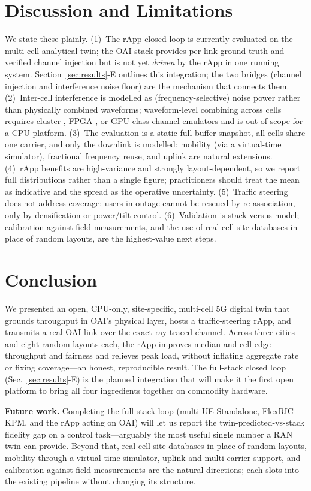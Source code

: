 \documentclass[conference]{IEEEtran}
\begin{document}
\section{Discussion and Limitations}\label{sec:disc}
We state these plainly. (1)~The rApp closed loop is currently evaluated on the
multi-cell analytical twin; the OAI stack provides per-link ground truth and
verified channel injection but is not yet \emph{driven} by the rApp in one running
system. Section~\ref{sec:results}-E outlines this integration; the two bridges
(channel injection and interference noise floor) are the mechanism that connects
them. (2)~Inter-cell interference is modelled as (frequency-selective)
noise power rather than physically combined waveforms; waveform-level combining
across cells requires cluster-, FPGA-, or GPU-class channel emulators and is out of
scope for a CPU platform. (3)~The evaluation is a static full-buffer snapshot, all
cells share one carrier, and only the downlink is modelled; mobility (via a
virtual-time simulator), fractional frequency reuse, and uplink are natural
extensions. (4)~rApp benefits are high-variance and strongly layout-dependent, so
we report full distributions rather than a single figure; practitioners should
treat the mean as indicative and the spread as the operative uncertainty.
(5)~Traffic steering does not address coverage: users in outage cannot be rescued
by re-association, only by densification or power/tilt control. (6)~Validation is
stack-versus-model; calibration against field measurements, and the use of real
cell-site databases in place of random layouts, are the highest-value next steps.

\section{Conclusion}
We presented an open, CPU-only, site-specific, multi-cell 5G digital twin that
grounds throughput in OAI's physical layer, hosts a traffic-steering rApp, and
transmits a real OAI link over the exact ray-traced channel. Across three cities
and eight random layouts each, the rApp improves median and cell-edge throughput
and fairness and relieves peak load, without inflating aggregate rate or fixing
coverage---an honest, reproducible result. The full-stack closed loop
(Sec.~\ref{sec:results}-E) is the planned integration that will make it the first
open platform to bring all four ingredients together on commodity hardware.

\textbf{Future work.} Completing the full-stack loop (multi-UE Standalone, FlexRIC
KPM, and the rApp acting on OAI) will let us report the twin-predicted-vs-stack
fidelity gap on a control task---arguably the most useful single number a RAN twin
can provide. Beyond that, real cell-site databases in place of random layouts,
mobility through a virtual-time simulator, uplink and multi-carrier support, and
calibration against field measurements are the natural directions; each slots into
the existing pipeline without changing its structure.
\end{document}
